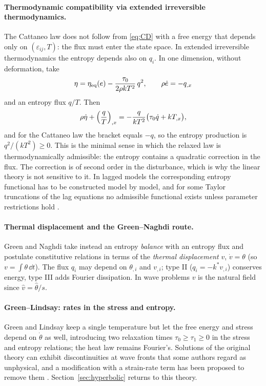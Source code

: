 \paragraph{Thermodynamic compatibility via extended irreversible thermodynamics.} The Cattaneo law does not follow from \eqref{eq:CD} with a free energy that depends only on $(\varepsilon_{ij},T)$: the flux must enter the state space. In extended irreversible thermodynamics \citep{Jou2010,MuellerRuggeri1998,Mueller1967} the entropy depends also on $q_i$. In one dimension, without deformation, take
\begin{equation}
\eta=\eta_{\rm eq}(e)-\frac{\tau_0}{2\rho kT^2}\,q^2,\qquad \rho\dot e=-q_{,x}
\end{equation}
and an entropy flux $q/T$. Then
\begin{equation}
\rho\dot\eta+\Bigl(\frac qT\Bigr)_{,x}=-\frac{q}{kT^2}\bigl(\tau_0\dot q+kT_{,x}\bigr),
\end{equation}
and for the Cattaneo law the bracket equals $-q$, so the entropy production is $q^2/(kT^2)\ge0$. This is the minimal sense in which the relaxed law is thermodynamically admissible: the entropy contains a quadratic correction in the flux. The correction is of second order in the disturbance, which is why the linear theory is not sensitive to it. In lagged models the corresponding entropy functional has to be constructed model by model, and for some Taylor truncations of the lag equations no admissible functional exists unless parameter restrictions hold \citep{Chirita2016,Tibullo2017}.

\paragraph{Thermal displacement and the Green--Naghdi route.} Green and Naghdi \citep{Green1991,Green1993} take instead an entropy \emph{balance} with an entropy flux and postulate constitutive relations in terms of the \emph{thermal displacement} $v$, $\dot v=\theta$ (so $v=\int\theta\,\dd t$). The flux $q_i$ may depend on $\theta_{,i}$ and $v_{,i}$; type II ($q_i=-k^*v_{,i}$) conserves energy, type III adds Fourier dissipation. In wave problems $v$ is the natural field since $\hat v=\hat\theta/s$.

\paragraph{Green--Lindsay: rates in the stress and entropy.} Green and Lindsay \citep{Green1972} keep a single temperature but let the free energy and stress depend on $\dot\theta$ as well, introducing two relaxation times $\tau_0\ge\tau_1\ge0$ in the stress and entropy relations; the heat law remains Fourier's. Solutions of the original theory can exhibit discontinuities at wave fronts that some authors regard as unphysical, and a modification with a strain-rate term has been proposed to remove them \citep{Yu2018ModifiedGL}. Section~\ref{sec:hyperbolic} returns to this theory.

